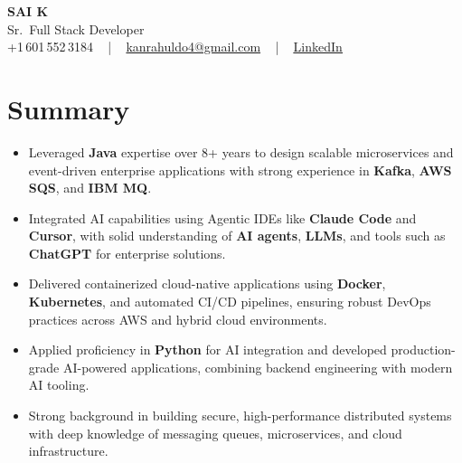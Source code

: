 \documentclass[letterpaper,11pt]{article}
\newcommand{\resumeItem}[1]{
  \item\footnotesize{
    {#1 \vspace{-2pt}}
  }
}
\newcommand{\resumeItemListStart}{\begin{itemize}[leftmargin=*]}
\newcommand{\resumeItemListEnd}{\end{itemize}\vspace{-5pt}}
\begin{document}
\begin{center}
    {\fontsize{14pt}{12pt}\selectfont \textbf{\MakeUppercase{Sai K}}}\\ \vspace{2pt}
    \fontsize{10pt}{12pt}\selectfont Sr.\ Full Stack Developer\\ \vspace{2pt}
    \fontsize{10pt}{12pt}\selectfont +1\,601\,552\,3184 ~ | ~
    \href{mailto:kanrahuldo4@gmail.com}{kanrahuldo4@gmail.com} ~ | ~
    \href{https://www.linkedin.com/in/srrrk/}{\color{blue}\underline{LinkedIn}}
    \vspace{-10pt}
\end{center}

\section{Summary}
\fontsize{9pt}{10pt}\selectfont
\resumeItemListStart
  \resumeItem{Leveraged \textbf{Java} expertise over 8+ years to design scalable microservices and event-driven enterprise applications with strong experience in \textbf{Kafka}, \textbf{AWS SQS}, and \textbf{IBM MQ}.}
  \resumeItem{Integrated AI capabilities using Agentic IDEs like \textbf{Claude Code} and \textbf{Cursor}, with solid understanding of \textbf{AI agents}, \textbf{LLMs}, and tools such as \textbf{ChatGPT} for enterprise solutions.}
  \resumeItem{Delivered containerized cloud-native applications using \textbf{Docker}, \textbf{Kubernetes}, and automated CI/CD pipelines, ensuring robust DevOps practices across AWS and hybrid cloud environments.}
  \resumeItem{Applied proficiency in \textbf{Python} for AI integration and developed production-grade AI-powered applications, combining backend engineering with modern AI tooling.}
  \resumeItem{Strong background in building secure, high-performance distributed systems with deep knowledge of messaging queues, microservices, and cloud infrastructure.}
\resumeItemListEnd
\vspace{-6pt}

\end{document}

